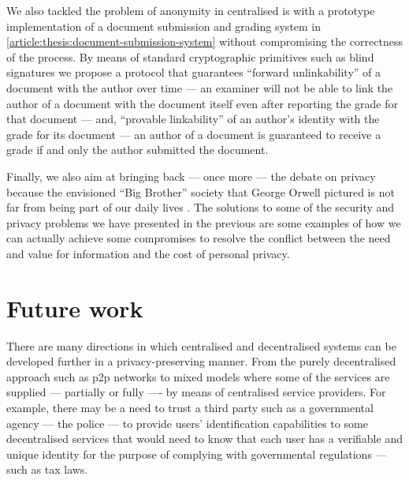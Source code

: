 We also tackled the problem of anonymity in centralised \ac{is} with a prototype 
implementation of a document submission and grading system in \cref{article:thesis:document-submission-system} 
without compromising the correctness of the process. By means of standard cryptographic 
primitives such as blind signatures we propose a protocol that guarantees ``forward 
unlinkability'' of a document with the author over time --- an examiner will not 
be able to link the author of a document with the document itself even after reporting 
the grade for that document --- and, ``provable linkability'' of an author's identity 
with the grade for its document --- an author of a document is guaranteed to receive 
a grade if and only the author submitted the document.

Finally, we also aim at bringing back --- once more --- the debate on privacy because 
the envisioned ``Big Brother'' society that George Orwell pictured is not far from 
being part of our daily lives \cite{Orwell49}. The solutions to some of the security 
and privacy problems we have presented in the previous  
are some examples of how we can actually achieve some compromises to resolve the 
conflict between the need and value for information and the cost of personal privacy.

\section{Future work}
    \label{section:thesis:future-work}
There are many directions in which centralised and decentralised systems can be 
developed further in a privacy-preserving manner. From the purely decentralised 
approach such as \ac{p2p} networks to mixed models where some of the services are 
supplied --- partially or fully ---- by means of centralised service providers. 
For example, there may be a need to trust a third party such as a governmental agency 
--- the police --- to provide users' identification capabilities to some decentralised
services that would need to know that each user has a verifiable and unique identity 
for the purpose of complying with governmental regulations --- such as tax laws.

